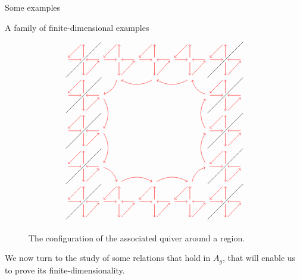 \begin{chapter}{Some examples}
\begin{section}{A family of finite-dimensional examples}
\begin{figure}[h]
\[\begin{tikzpicture}
\foreach \x in {-6.75,-5.25,...,0.25}
{
\draw (-3.75, \x) -- (-2.25, \x+1.5);
\draw (3.75, \x+1.5) -- (2.25, \x);
}

\foreach \x in {-3.75,-2.25,...,2.25}
{
\draw[->, red] (\x+0.85, -0.65) -- (\x+1.4, -0.05);
\draw[->, red] (\x+1.4, 0) -- (\x+0.85, 0);
\draw[->, red] (\x+0.75, -0.1) -- (\x+0.75, -0.65);
\draw[->, red] (\x+0.85, -6.65) -- (\x+1.4, -6.05);
\draw[->, red] (\x+1.4, -6) -- (\x+0.85, -6);
\draw[->, red] (\x+0.75, -6.1) -- (\x+0.75, -6.65);

\draw[->, red] (\x+0.75, 0.1) -- (\x+0.75, 0.65);
\draw[->, red] (\x+0.65, 0.65) -- (\x+0.1, 0.1);
\draw[->, red] (\x+0.1, 0) -- (\x+0.65, 0);
\draw[->, red] (\x+0.75, -5.9) -- (\x+0.75, -5.35);
\draw[->, red] (\x+0.65, -5.35) -- (\x+0.1, -5.9);
\draw[->, red] (\x+0.1, -6) -- (\x+0.65, -6);
}

\foreach \x in {-0.75,-2.25,-3.75}
{
\draw[->, red] (-2.35, \x-0.75) -- (-2.9, \x-0.75);
\draw[->, red] (-3, \x-0.85) -- (-3, \x-1.4);
\draw[->, red] (-2.9, \x-1.4) -- (-2.35, \x-0.85);
\draw[->, red] (3.65, \x-0.75) -- (3.1, \x-0.75);
\draw[->, red] (3, \x-0.85) -- (3, \x-1.4);
\draw[->, red] (3.1, \x-1.4) -- (3.65, \x-0.85);

\draw[->, red] (-3, \x-0.65) -- (-3, \x-0.1);
\draw[->, red] (-3.1, \x-0.1) -- (-3.65, \x-0.65);
\draw[->, red] (-3.65, \x-0.75) -- (-3.1, \x-0.75);
\draw[->, red] (3, \x-0.65) -- (3, \x-0.1);
\draw[->, red] (2.9, \x-0.1) -- (2.35, \x-0.65);
\draw[->, red] (2.35, \x-0.75) -- (2.9, \x-0.75);
}

\draw[<-, red] (-1.4, -0.85) to [bend right] (-0.1, -0.85);
\draw[<-, red] (0.1, -0.85) to [bend right] (1.4, -0.85);
\draw[->,  red] (-1.4, -5.15) to [bend left] (-0.1, -5.15);
\draw[->, red] (0.1, -5.15) to [bend left] (1.4, -5.15);

\draw[->, red] (-2.15, -1.65) to [bend left] (-2.15, -2.9);
\draw[->, red] (-2.15, -3.1) to [bend left] (-2.15, -4.35);
\draw[<-, red] (2.15, -1.65) to [bend right] (2.15, -2.9);
\draw[<-, red] (2.15, -3.1) to [bend right] (2.15, -4.35);

\draw[->, red] (-1.6, -0.85) to [bend left] (-2.15, -1.45);
\draw[->, red] (-2.15, -4.55) to [bend left] (-1.6, -5.15);
\draw[<-, red] (1.6, -0.85) to [bend right] (2.15, -1.45);
\draw[<-, red] (2.15, -4.55) to [bend right] (1.6, -5.15);
\end{tikzpicture}
\]
\caption{The configuration of the associated quiver around a region.}
\end{figure}
We now turn to the study of some relations that hold in $A_g$, that will enable us to prove its finite-dimensionality.


\end{section}
\end{chapter}
